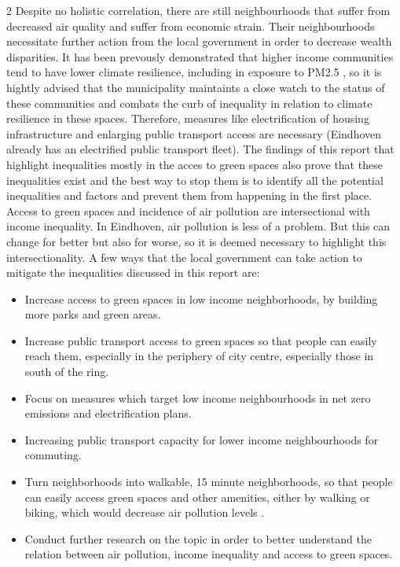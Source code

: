 \documentclass[12pt, a4paper]{article}
\begin{document}
\begin{multicols}{2}
    Despite no holistic correlation, there are still neighbourhoods that suffer from decreased air quality and suffer from economic strain. Their neighbourhoods necessitate further action from the local government in order to decrease wealth disparities. It has been prevously demonstrated that higher income communities tend to have lower climate resilience, including in exposure to PM2.5 \cite{li2023urban}, so it is hightly advised that the municipality maintaints a close watch to the status of these communities and combats the curb of inequality in relation to climate resilience in these spaces. Therefore, measures like electrification of housing infrastructure \cite{sierraclub2019electrification} and enlarging public transport access are necessary \cite{uttan2022climateresilient} (Eindhoven already has an electrified public transport fleet). The findings of this report that highlight inequalities mostly in the acces to green spaces also prove that these inequalities exist and the best way to stop them is to identify all the potential inequalities and factors and prevent them from happening in the first place. Access to green spaces and incidence of air pollution are intersectional with income inequality. In Eindhoven, air pollution is less of a problem. But this can change for better but also for worse, so it is deemed necessary to highlight this intersectionality.
    \linebreak
    A few ways that the local government can take action to mitigate the inequalities discussed in this report are:
    \begin{itemize}
        \item Increase access to green spaces in low income neighborhoods, by building more parks and green areas.
        \item Increase public transport access to green spaces so that people can easily reach them, especially in the periphery of city centre, especially those in south of the ring.
        \item Focus on measures which target low income neighbourhoods in net zero emissions and electrification plans.
        \item Increasing public transport capacity for lower income neighbourhoods for commuting.
        \item Turn neighborhoods into walkable, 15 minute neighborhoods, so that people can easily access green spaces and other amenities, either by walking or biking, which would decrease air pollution levels \cite{smartcities8020053}.
        \item Conduct further research on the topic in order to better understand the relation between air pollution, income inequality and access to green spaces.

\end{itemize}
\end{multicols}
\end{document}
